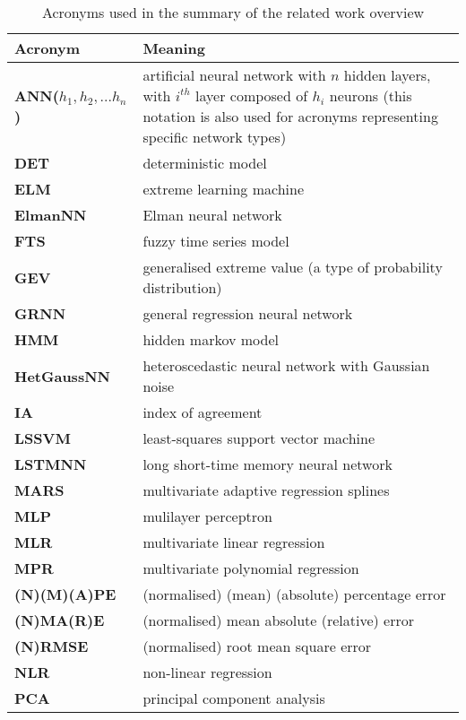\begin{table}[ht]
\centering
\caption{Acronyms used in the summary of the related work overview} 
\label{tab:related-work-acronyms}
\begingroup\scriptsize
\begin{tabularx}{\linewidth}{lX}
  \toprule
Acronym & Meaning \\ 
  \midrule
\textbf{ ANN($h_1, h_2, ... h_n$) } &  artificial neural network with $n$ hidden layers, with $i^{th}$ layer composed of $h_i$ neurons (this notation is also used for acronyms representing specific network types) \\ 
  \textbf{ DET } &  deterministic model \\ 
  \textbf{ ELM } &  extreme learning machine \\ 
  \textbf{ ElmanNN } &  Elman neural network \\ 
  \textbf{ FTS } &  fuzzy time series model \\ 
  \textbf{ GEV } &  generalised extreme value (a type of probability distribution) \\ 
  \textbf{ GRNN } &  general regression neural network \\ 
  \textbf{ HMM } &  hidden markov model \\ 
  \textbf{ HetGaussNN } &  heteroscedastic neural network with Gaussian noise \\ 
  \textbf{ IA } &  index of agreement \\ 
  \textbf{ LSSVM } &  least-squares support vector machine \\ 
  \textbf{ LSTMNN } &  long short-time memory neural network \\ 
  \textbf{ MARS } &  multivariate adaptive regression splines \\ 
  \textbf{ MLP } &  mulilayer perceptron \\ 
  \textbf{ MLR } &  multivariate linear regression \\ 
  \textbf{ MPR } &  multivariate polynomial regression \\ 
  \textbf{ (N)(M)(A)PE } &  (normalised) (mean) (absolute) percentage error \\ 
  \textbf{ (N)MA(R)E } &  (normalised) mean absolute (relative) error \\ 
  \textbf{ (N)RMSE } &  (normalised) root mean square error \\ 
  \textbf{ NLR } &  non-linear regression \\ 
  \textbf{ PCA } &  principal component analysis \\ 

\end{tabularx}
\end{table}
